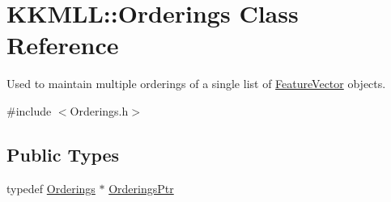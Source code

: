 \hypertarget{class_k_k_m_l_l_1_1_orderings}{}\section{K\+K\+M\+LL\+:\+:Orderings Class Reference}
\label{class_k_k_m_l_l_1_1_orderings}


Used to maintain multiple orderings of a single list of \hyperlink{class_k_k_m_l_l_1_1_feature_vector}{Feature\+Vector} objects.  




{\ttfamily \#include $<$Orderings.\+h$>$}

\subsection*{Public Types}
\begin{DoxyCompactItemize}
\item 
typedef \hyperlink{class_k_k_m_l_l_1_1_orderings}{Orderings} $\ast$ \hyperlink{class_k_k_m_l_l_1_1_orderings_af1bbd9a32dc13a33a747c4c5c0112714}{Orderings\+Ptr}
\end{DoxyCompactItemize}
